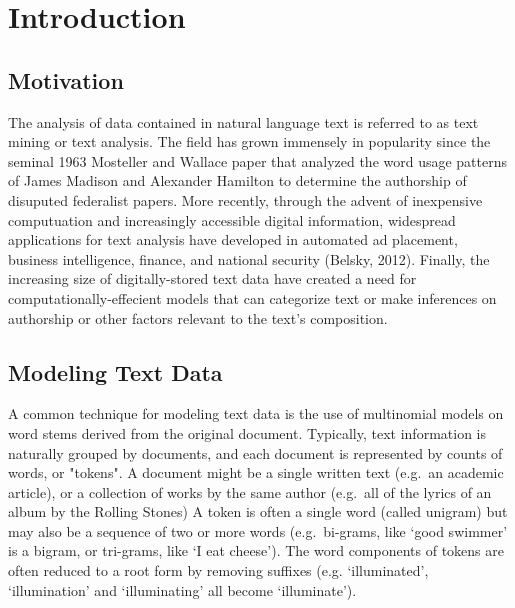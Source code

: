 \documentclass[12pt]{article}
\begin{document}
\vspace{1.5in}
\tableofcontents


\newpage


\section{Introduction}

\subsection{Motivation}


The analysis of data contained in natural language text is referred to as text mining or text analysis. 
The field has grown immensely in popularity since the seminal 1963 Mosteller and Wallace paper that analyzed the
word usage patterns of James Madison and Alexander Hamilton to determine the authorship of disuputed federalist papers.
More recently, through the advent of inexpensive computuation and increasingly accessible digital information, widespread applications for text analysis have developed in automated ad placement, business intelligence, finance, and national security (Belsky, 2012).
Finally, the increasing size of digitally-stored text data have created a need for computationally-effecient models that can categorize text or make inferences on authorship or other factors relevant to the text's composition. 

\subsection{Modeling Text Data}


A common technique for modeling text data is the use of multinomial models on word stems derived from the original document.
Typically, text information is naturally grouped by documents, and each
document is represented by counts of words, or "tokens". A document might be a
single written text (e.g.~an academic article), or a collection of works
by the same author (e.g.~all of the lyrics of an album by the Rolling
Stones) A token is often a single word (called unigram) but may also be
a sequence of two or more words (e.g.~bi-grams, like `good swimmer' is a
bigram, or tri-grams, like `I eat cheese'). The word components of
tokens are often reduced to a root form by removing suffixes (e.g.
`illuminated', `illumination' and `illuminating' all become
`illuminate').
\end{document}
